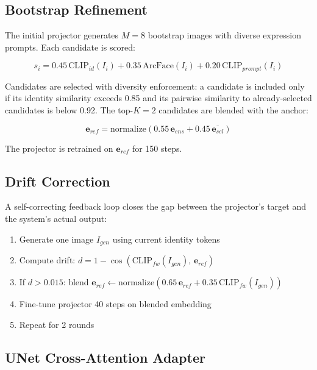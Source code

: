 \documentclass[10pt,twocolumn]{article}
\begin{document}
\subsection{Bootstrap Refinement}

The initial projector generates $M=8$ bootstrap images with diverse expression prompts. Each candidate is scored:

\begin{equation}
s_i = 0.45\,\text{CLIP}_{id}(I_i) + 0.35\,\text{ArcFace}(I_i) + 0.20\,\text{CLIP}_{prompt}(I_i)
\end{equation}

Candidates are selected with diversity enforcement: a candidate is included only if its identity similarity exceeds 0.85 and its pairwise similarity to already-selected candidates is below 0.92. The top-$K=2$ candidates are blended with the anchor:

\begin{equation}
\mathbf{e}_{ref} = \text{normalize}\!\left(0.55\,\mathbf{e}_{ens} + 0.45\,\overline{\mathbf{e}_{sel}}\right)
\end{equation}

The projector is retrained on $\mathbf{e}_{ref}$ for 150 steps.

\subsection{Drift Correction}

A self-correcting feedback loop closes the gap between the projector's target and the system's actual output:

\begin{enumerate}[leftmargin=*,topsep=2pt,itemsep=1pt]
    \item Generate one image $I_{gen}$ using current identity tokens
    \item Compute drift: $d = 1 - \cos(\text{CLIP}_{fw}(I_{gen}),\, \mathbf{e}_{ref})$
    \item If $d > 0.015$: blend $\mathbf{e}_{ref} \leftarrow \text{normalize}(0.65\,\mathbf{e}_{ref} + 0.35\,\text{CLIP}_{fw}(I_{gen}))$
    \item Fine-tune projector 40 steps on blended embedding
    \item Repeat for 2 rounds
\end{enumerate}

\subsection{UNet Cross-Attention Adapter}
\end{document}
